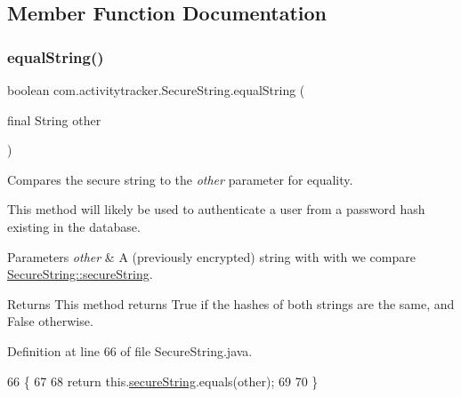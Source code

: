 \subsection{Member Function Documentation}
\mbox{\label{classcom_1_1activitytracker_1_1_secure_string_a8b5c3cac74b22ff0eb3c43a7ebd980f5}} 
\subsubsection{\texorpdfstring{equal\+String()}{equalString()}}
{\footnotesize\ttfamily boolean com.\+activitytracker.\+Secure\+String.\+equal\+String (\begin{DoxyParamCaption}\item[{final String}]{other }\end{DoxyParamCaption})}

Compares the secure string to the {\itshape other} parameter for equality.

This method will likely be used to authenticate a user from a password hash existing in the database.


\begin{DoxyParams}{Parameters}
{\em other} & A (previously encrypted) string with with we compare \mbox{\hyperlink{classcom_1_1activitytracker_1_1_secure_string_a1448f7b8865c6c57cc7218662ee7f1ee}{Secure\+String\+::secure\+String}}.\\
\hline
\end{DoxyParams}
\begin{DoxyReturn}{Returns}
This method returns True if the hashes of both strings are the same, and False otherwise. 
\end{DoxyReturn}


Definition at line 66 of file Secure\+String.\+java.


\begin{DoxyCode}
66                                                    \{
67 
68         \textcolor{keywordflow}{return} this.\mbox{\hyperlink{classcom_1_1activitytracker_1_1_secure_string_a1448f7b8865c6c57cc7218662ee7f1ee}{secureString}}.equals(other);
69 
70     \}
\end{DoxyCode}
\mbox{\label{classcom_1_1activitytracker_1_1_secure_string_a1907ad109bb5e64291fabd3ff459ef49}} 
